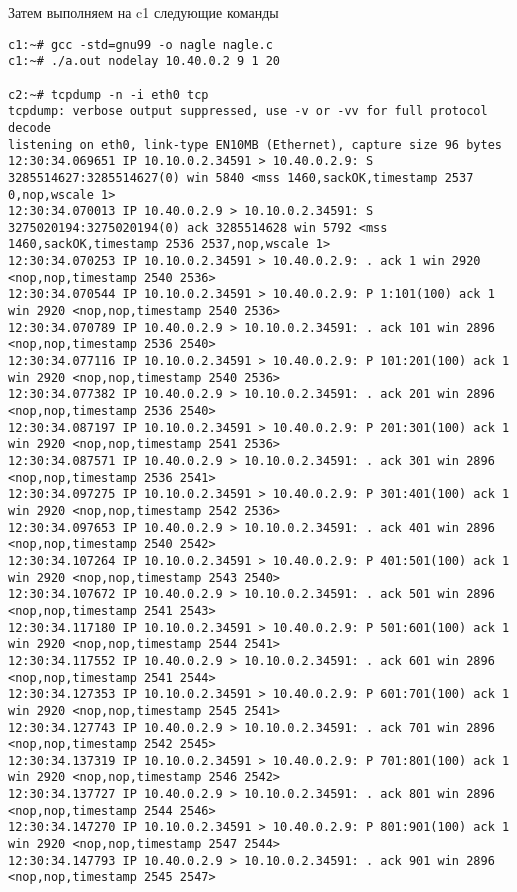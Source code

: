 \documentclass[a4paper,12pt]{article}
\begin{document}
Затем выполняем на c1 следующие команды

\begin{lstlisting}
c1:~# gcc -std=gnu99 -o nagle nagle.c
c1:~# ./a.out nodelay 10.40.0.2 9 1 20

c2:~# tcpdump -n -i eth0 tcp
tcpdump: verbose output suppressed, use -v or -vv for full protocol decode
listening on eth0, link-type EN10MB (Ethernet), capture size 96 bytes
12:30:34.069651 IP 10.10.0.2.34591 > 10.40.0.2.9: S 3285514627:3285514627(0) win 5840 <mss 1460,sackOK,timestamp 2537 0,nop,wscale 1>
12:30:34.070013 IP 10.40.0.2.9 > 10.10.0.2.34591: S 3275020194:3275020194(0) ack 3285514628 win 5792 <mss 1460,sackOK,timestamp 2536 2537,nop,wscale 1>
12:30:34.070253 IP 10.10.0.2.34591 > 10.40.0.2.9: . ack 1 win 2920 <nop,nop,timestamp 2540 2536>
12:30:34.070544 IP 10.10.0.2.34591 > 10.40.0.2.9: P 1:101(100) ack 1 win 2920 <nop,nop,timestamp 2540 2536>
12:30:34.070789 IP 10.40.0.2.9 > 10.10.0.2.34591: . ack 101 win 2896 <nop,nop,timestamp 2536 2540>
12:30:34.077116 IP 10.10.0.2.34591 > 10.40.0.2.9: P 101:201(100) ack 1 win 2920 <nop,nop,timestamp 2540 2536>
12:30:34.077382 IP 10.40.0.2.9 > 10.10.0.2.34591: . ack 201 win 2896 <nop,nop,timestamp 2536 2540>
12:30:34.087197 IP 10.10.0.2.34591 > 10.40.0.2.9: P 201:301(100) ack 1 win 2920 <nop,nop,timestamp 2541 2536>
12:30:34.087571 IP 10.40.0.2.9 > 10.10.0.2.34591: . ack 301 win 2896 <nop,nop,timestamp 2536 2541>
12:30:34.097275 IP 10.10.0.2.34591 > 10.40.0.2.9: P 301:401(100) ack 1 win 2920 <nop,nop,timestamp 2542 2536>
12:30:34.097653 IP 10.40.0.2.9 > 10.10.0.2.34591: . ack 401 win 2896 <nop,nop,timestamp 2540 2542>
12:30:34.107264 IP 10.10.0.2.34591 > 10.40.0.2.9: P 401:501(100) ack 1 win 2920 <nop,nop,timestamp 2543 2540>
12:30:34.107672 IP 10.40.0.2.9 > 10.10.0.2.34591: . ack 501 win 2896 <nop,nop,timestamp 2541 2543>
12:30:34.117180 IP 10.10.0.2.34591 > 10.40.0.2.9: P 501:601(100) ack 1 win 2920 <nop,nop,timestamp 2544 2541>
12:30:34.117552 IP 10.40.0.2.9 > 10.10.0.2.34591: . ack 601 win 2896 <nop,nop,timestamp 2541 2544>
12:30:34.127353 IP 10.10.0.2.34591 > 10.40.0.2.9: P 601:701(100) ack 1 win 2920 <nop,nop,timestamp 2545 2541>
12:30:34.127743 IP 10.40.0.2.9 > 10.10.0.2.34591: . ack 701 win 2896 <nop,nop,timestamp 2542 2545>
12:30:34.137319 IP 10.10.0.2.34591 > 10.40.0.2.9: P 701:801(100) ack 1 win 2920 <nop,nop,timestamp 2546 2542>
12:30:34.137727 IP 10.40.0.2.9 > 10.10.0.2.34591: . ack 801 win 2896 <nop,nop,timestamp 2544 2546>
12:30:34.147270 IP 10.10.0.2.34591 > 10.40.0.2.9: P 801:901(100) ack 1 win 2920 <nop,nop,timestamp 2547 2544>
12:30:34.147793 IP 10.40.0.2.9 > 10.10.0.2.34591: . ack 901 win 2896 <nop,nop,timestamp 2545 2547>

\end{lstlisting}
\end{document}
